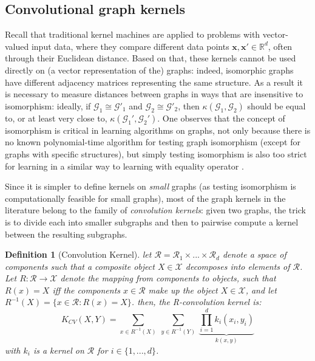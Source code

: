 \subsection{Convolutional graph kernels}
Recall that traditional kernel machines are applied to problems with vector-valued input data, where they compare different data points $\mathbf{x},\mathbf{x}' \in \mathbb{R}^d$, often through their Euclidean distance. Based on that, these kernels cannot be used directly on (a vector representation of the) graphs: indeed, isomorphic graphs have different adjacency matrices representing the same structure. As a result it is necessary to measure distances between graphs in ways that are insensitive to isomorphism: ideally, if $\mathcal{G}_1 \cong \mathcal{G}'_1$ and $\mathcal{G}_2 \cong \mathcal{G}'_2$, then $\kappa(\mathcal{G}_1, \mathcal{G}_2)$ should be equal to, or at least very close to, $\kappa(\mathcal{G}_1', \mathcal{G}_2')$. One observes that the concept of isomorphism is critical in learning algorithms on graphs, not only because there is no known polynomial-time algorithm for testing graph isomorphism (except for graphs with specific structures), but simply testing isomorphism is also too strict for learning in a similar way to learning with equality operator  \citep{kriege_graph_kernels}.

Since it is simpler to define kernels on \emph{small} graphs (as testing isomorphism is computationally feasible for small graphs), most of the graph kernels in the literature belong to the family of \emph{convolution kernels}: given two graphs, the trick is to divide each into smaller subgraphs and then to pairwise compute a kernel between the resulting subgraphs.
\newtheorem{definition}{Definition} 
\begin{definition}[Convolution Kernel]
let $\mathcal{R}=\mathcal{R}_1\times...\times \mathcal{R}_d$ denote a space of components such that a composite object $X\in \mathcal{X}$ decomposes into elements of $\mathcal{R}$. Let $R:\mathcal{R}\xrightarrow{}\mathcal{X}$ denote the mapping from components to objects, such that $R(x)=X$ iff the components $x\in \mathcal{R}$ make up the object $X\in \mathcal{X}$, and let $R^{-1}(X)=\{x\in\mathcal{R}:R(x)=X\}$. then, the R-convolution kernel is:
\begin{equation}
\label{eq:conolutional_kernels}
    K_{CV}(X,Y)=\sum_{x\in R^{-1}(X)}~\sum_{y\in R^{-1}(Y)}~\underbrace{\prod_{i=1}^{d}k_i(x_i,y_i)}_{k(x,y)}
\end{equation}
with $k_i$ is a kernel on $\mathcal{R}$ for $i\in\{1,...,d\}$.
\end{definition}

